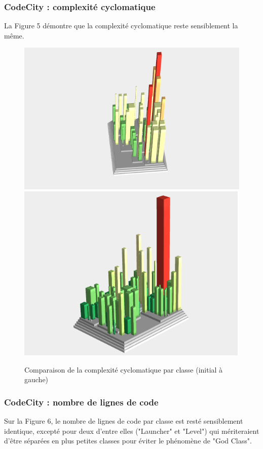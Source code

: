 \documentclass[a4paper,12pt]{report} %
\begin{document}
\subsubsection{CodeCity : complexité cyclomatique}
La Figure 5 démontre que la complexité cyclomatique reste sensiblement
la même.

\begin{figure}[!h]
\includegraphics[scale=0.5]{ressources/final_initial_cyclomatic}\includegraphics[scale=0.5]{ressources/final_new_cyclomatic}\caption{Comparaison de la complexité cyclomatique par classe (initial à gauche)}


\end{figure}

\subsubsection{CodeCity : nombre de lignes de code}
Sur la Figure 6, le nombre de lignes de code par
classe est resté sensiblement identique, excepté pour deux d'entre elles
("Launcher" et "Level") qui mériteraient d'être séparées en plus petites
classes pour éviter le phénomène de "God Class".
\end{document}
